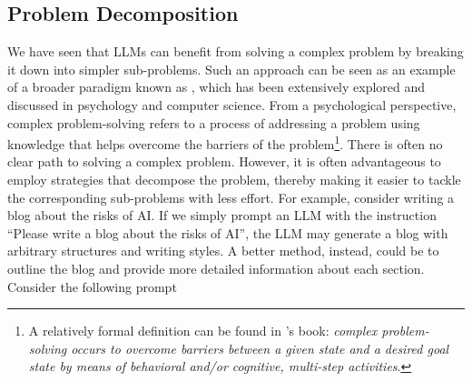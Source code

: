 \subsection{Problem Decomposition}
\label{sec:problem-decomposition}

\noindent We have seen that LLMs can benefit from solving a complex problem by breaking it down into simpler sub-problems. Such an approach can be seen as an example of a broader paradigm known as , which has been extensively explored and discussed in psychology and computer science. From a psychological perspective, complex problem-solving refers to a process of addressing a problem using knowledge that helps overcome the barriers of the problem\footnote{A relatively formal definition can be found in \citet{frensch-and-funke:2014complex}'s book: \textit{complex problem-solving occurs to overcome barriers between a given state and a desired goal state by means of behavioral and/or cognitive, multi-step activities}.}.  There is often no clear path to solving a complex problem. However, it is often advantageous to employ strategies that decompose the problem, thereby making it easier to tackle the corresponding sub-problems with less effort. For example, consider writing a blog about the risks of AI. If we simply prompt an LLM with the instruction ``Please write a blog about the risks of AI'', the LLM may generate a blog with arbitrary structures and writing styles. A better method, instead, could be to outline the blog and provide more detailed information about each section. Consider the following prompt

